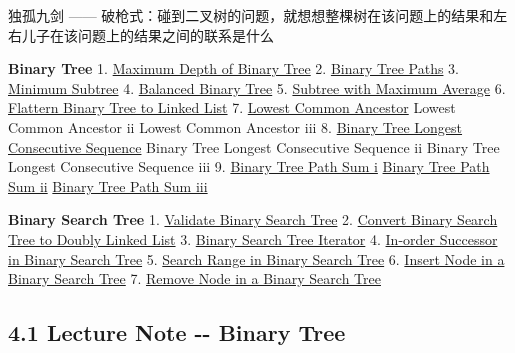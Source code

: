 \documentclass[11pt]{article}
\begin{document}
独孤九剑 ------
破枪式：碰到二叉树的问题，就想想整棵树在该问题上的结果和左右儿子在该问题上的结果之间的联系是什么

\textbf{Binary Tree} 1.
\href{http://www.jiuzhang.com/solutions/maximum-depth-of-binary-tree/}{Maximum
Depth of Binary Tree} 2.
\href{https://www.jiuzhang.com/solutions/binary-tree-paths/}{Binary Tree
Paths} 3.
\href{http://www.jiuzhang.com/solutions/minimum-subtree/}{Minimum
Subtree} 4.
\href{http://www.jiuzhang.com/solutions/balanced-binary-tree/}{Balanced
Binary Tree} 5.
\href{http://www.jiuzhang.com/solutions/subtree-with-maximum-average/}{Subtree
with Maximum Average} 6.
\href{http://www.jiuzhang.com/solutions/flatten-binary-tree-to-linked-list/}{Flattern
Binary Tree to Linked List} 7.
\href{http://www.jiuzhang.com/solutions/lowest-common-ancestor/}{Lowest
Common Ancestor} Lowest Common Ancestor ii Lowest Common Ancestor iii 8.
\href{http://www.jiuzhang.com/solutions/binary-tree-longest-consecutive-sequence/}{Binary
Tree Longest Consecutive Sequence} Binary Tree Longest Consecutive
Sequence ii Binary Tree Longest Consecutive Sequence iii 9.
\href{http://www.lintcode.com/problem/binary-tree-path-sum/}{Binary Tree
Path Sum i}
\href{http://www.lintcode.com/problem/binary-tree-path-sum-ii/}{Binary
Tree Path Sum ii}
\href{http://www.lintcode.com/problem/binary-tree-path-sum-iii/}{Binary
Tree Path Sum iii}

\textbf{Binary Search Tree} 1.
\href{http://www.jiuzhang.com/solutions/validate-binary-search-tree/}{Validate
Binary Search Tree} 2.
\href{http://www.jiuzhang.com/solutions/convert-binary-search-tree-to-doubly-linked-list/}{Convert
Binary Search Tree to Doubly Linked List} 3.
\href{http://www.jiuzhang.com/solutions/binary-search-tree-iterator}{Binary
Search Tree Iterator} 4.
\href{http://www.jiuzhang.com/solutions/inorder-successor-in-binary-search-tree/}{In-order
Successor in Binary Search Tree} 5.
\href{http://www.lintcode.com/problem/search-range-in-binary-search-tree/}{Search
Range in Binary Search Tree} 6.
\href{http://www.lintcode.com/problem/insert-node-in-a-binary-search-tree/}{Insert
Node in a Binary Search Tree} 7.
\href{http://www.mathcs.emory.edu/~cheung/Courses/171/Syllabus/9-BinTree/BST-delete.html}{Remove
Node in a Binary Search Tree}

    \subsection{4.1 Lecture Note -\/- Binary
Tree}\label{lecture-note----binary-tree}
\end{document}
